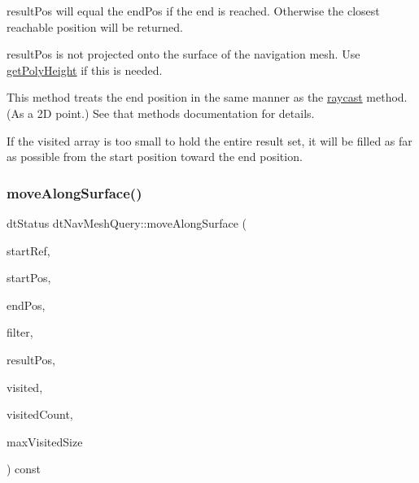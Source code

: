 {\ttfamily result\+Pos} will equal the {\ttfamily end\+Pos} if the end is reached. Otherwise the closest reachable position will be returned.

{\ttfamily result\+Pos} is not projected onto the surface of the navigation mesh. Use \hyperlink{classdtNavMeshQuery_af8303a12749e252c6688c15c5c887b69}{get\+Poly\+Height} if this is needed.

This method treats the end position in the same manner as the \hyperlink{classdtNavMeshQuery_a7509a4bf31a215f20478c5050ef25913}{raycast} method. (As a 2D point.) See that method\textquotesingle{}s documentation for details.

If the {\ttfamily visited} array is too small to hold the entire result set, it will be filled as far as possible from the start position toward the end position. \mbox{\label{classdtNavMeshQuery_a95f6d7c92a75c7773ababeb144206968}} 
\subsubsection{\texorpdfstring{move\+Along\+Surface()}{moveAlongSurface()}\hspace{0.1cm}{\footnotesize\ttfamily [2/2]}}
{\footnotesize\ttfamily dt\+Status dt\+Nav\+Mesh\+Query\+::move\+Along\+Surface (\begin{DoxyParamCaption}\item[{\hyperlink{group__detour_gab4e0b2257a670c1a800057999612b466}{dt\+Poly\+Ref}}]{start\+Ref,  }\item[{const float $\ast$}]{start\+Pos,  }\item[{const float $\ast$}]{end\+Pos,  }\item[{const \hyperlink{classdtQueryFilter}{dt\+Query\+Filter} $\ast$}]{filter,  }\item[{float $\ast$}]{result\+Pos,  }\item[{\hyperlink{group__detour_gab4e0b2257a670c1a800057999612b466}{dt\+Poly\+Ref} $\ast$}]{visited,  }\item[{int $\ast$}]{visited\+Count,  }\item[{const int}]{max\+Visited\+Size }\end{DoxyParamCaption}) const}

